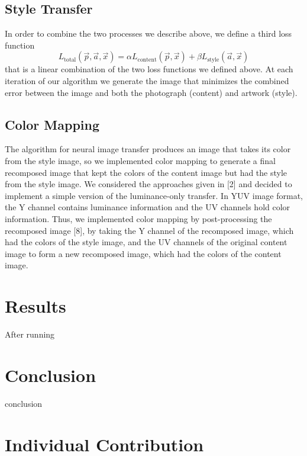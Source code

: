 \documentclass[10pt,twocolumn,letterpaper]{article}
\begin{document}
\subsection{Style Transfer}

In order to combine the two processes we describe above, we define a third loss function
\[ L_{\text{total}}(\vec{p}, \vec{a}, \vec{x}) = \alpha L_{\text{content}}(\vec{p}, \vec{x}) + \beta L_{\text{style}} (\vec{a}, \vec{x}) \]
that is a linear combination of the two loss functions we defined above. At each iteration of our algorithm we generate the image that minimizes the combined error between the image and both the photograph (content) and artwork (style). 

\subsection{Color Mapping}

The algorithm for neural image transfer produces an image that takes its color from the style image, so we implemented color mapping to generate a final recomposed image that kept the colors of the content image but had the style from the style image. We considered the approaches given in [2] and decided to implement a simple version of the luminance-only transfer. In YUV image format, the Y channel contains luminance information and the UV channels hold color information. Thus, we implemented color mapping by post-processing the recomposed image [8], by taking the Y channel of the recomposed image, which had the colors of the style image, and the UV channels of the original content image to form a new recomposed image, which had the colors of the content image. 

\section{Results}

After running 

\section{Conclusion}

conclusion

\section{Individual Contribution}
\end{document}
